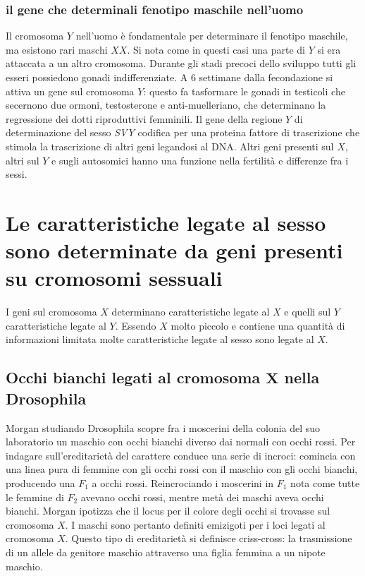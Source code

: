 		\subsubsection{il gene che determinali fenotipo maschile nell'uomo}
		Il cromosoma $Y$ nell'uomo \`e fondamentale per determinare il fenotipo maschile, ma esistono rari maschi $XX$.
		Si nota come in questi casi una parte di $Y$ si era attaccata a un altro cromosoma. 
		Durante gli stadi precoci dello sviluppo tutti gli esseri possiedono gonadi indifferenziate.
		A $6$ settimane dalla fecondazione si attiva un gene sul cromosoma $Y$: questo fa tasformare le gonadi in testicoli che secernono due ormoni, testosterone e anti-muelleriano, che determinano la regressione dei dotti riproduttivi femminili.
		Il gene della regione $Y$ di determinazione del sesso \emph{SVY} codifica per una proteina fattore di trascrizione che stimola la trascrizione di altri geni legandosi al DNA.
		Altri geni presenti sul $X$, altri sul $Y$ e sugli autosomici hanno una funzione nella fertilit\`a e differenze fra i sessi.

\section{Le caratteristiche legate al sesso sono determinate da geni presenti su cromosomi sessuali}
I geni sul cromosoma $X$ determinano caratteristiche legate al $X$ e quelli sul $Y$ caratteristiche legate al $Y$.
Essendo $X$ molto piccolo e contiene una quantit\`a di informazioni limitata molte caratteristiche legate al sesso sono legate al $X$.

	\subsection{Occhi bianchi legati al cromosoma $\mathbf{X}$ nella Drosophila}
	Morgan studiando Drosophila scopre fra i moscerini della colonia del suo laboratorio un maschio con occhi bianchi diverso dai normali con occhi rossi.
	Per indagare sull'ereditariet\`a del carattere conduce una serie di incroci: comincia con una linea pura di femmine con gli occhi rossi con il maschio con gli occhi bianchi, producendo una $F_1$
	a occhi rossi.
	Reincrociando i moscerini in $F_1$ nota come tutte le femmine di $F_2$ avevano occhi rossi, mentre met\`a dei maschi aveva occhi bianchi.
	Morgan ipotizza che il locus per il colore degli occhi si trovasse sul cromosoma $X$.
	I maschi sono pertanto definiti emizigoti per i loci legati al cromosoma $X$.
	Questo tipo di ereditariet\`a si definisce criss-cross: la trasmissione di un allele da genitore maschio attraverso una figlia femmina a un nipote maschio.


